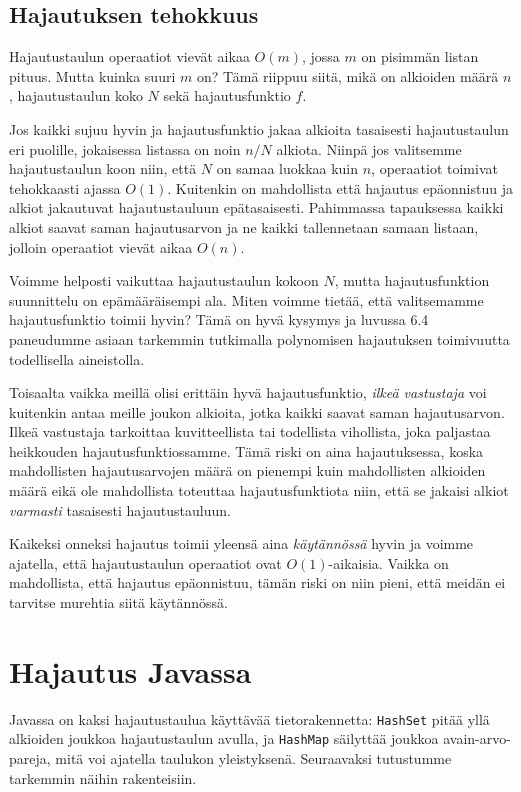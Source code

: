 \subsection{Hajautuksen tehokkuus}

Hajautustaulun operaatiot vievät aikaa $O(m)$,
jossa $m$ on pisimmän listan pituus.
Mutta kuinka suuri $m$ on? Tämä riippuu siitä,
mikä on alkioiden määrä $n$, hajautustaulun koko $N$
sekä hajautusfunktio $f$.

Jos kaikki sujuu hyvin ja hajautusfunktio jakaa alkioita
tasaisesti hajautustaulun eri puolille,
jokaisessa listassa on noin $n/N$ alkiota.
Niinpä jos valitsemme hajautustaulun koon niin,
että $N$ on samaa luokkaa kuin $n$,
operaatiot toimivat tehokkaasti ajassa $O(1)$.
Kuitenkin on mahdollista että hajautus epäonnistuu
ja alkiot jakautuvat hajautustauluun epätasaisesti.
Pahimmassa tapauksessa kaikki alkiot saavat saman
hajautusarvon ja ne kaikki tallennetaan samaan listaan,
jolloin operaatiot vievät aikaa $O(n)$.

Voimme helposti vaikuttaa hajautustaulun kokoon $N$,
mutta hajautusfunktion suunnittelu on epämääräisempi ala.
Miten voimme tietää, että valitsemamme hajautusfunktio
toimii hyvin?
Tämä on hyvä kysymys ja luvussa 6.4
paneudumme asiaan tarkemmin tutkimalla polynomisen
hajautuksen toimivuutta todellisella aineistolla.

Toisaalta vaikka meillä olisi erittäin hyvä hajautusfunktio,
\emph{ilkeä vastustaja} voi kuitenkin antaa
meille joukon alkioita, jotka kaikki saavat saman hajautusarvon.
Ilkeä vastustaja tarkoittaa kuvitteellista tai todellista vihollista,
joka paljastaa heikkouden hajautusfunktiossamme.
Tämä riski on aina hajautuksessa, koska mahdollisten
hajautusarvojen määrä on pienempi kuin mahdollisten alkioiden määrä
eikä ole mahdollista toteuttaa hajautusfunktiota niin,
että se jakaisi alkiot \emph{varmasti} tasaisesti hajautustauluun.

Kaikeksi onneksi hajautus toimii yleensä aina \emph{käytännössä}
hyvin ja voimme ajatella, että hajautustaulun operaatiot ovat
$O(1)$-aikaisia.
Vaikka on mahdollista, että hajautus epäonnistuu,
tämän riski on niin pieni, että meidän ei tarvitse murehtia
siitä käytännössä.

\section{Hajautus Javassa}

Javassa on kaksi hajautustaulua käyttävää tietorakennetta:
\texttt{HashSet} pitää yllä alkioiden joukkoa
hajautustaulun avulla, ja \texttt{HashMap} säilyttää
joukkoa avain-arvo-pareja, mitä voi ajatella taulukon yleistyksenä.
Seuraavaksi tutustumme tarkemmin näihin rakenteisiin.

